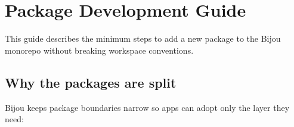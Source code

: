 \chapter{Package Development Guide}\label{record-011}

\smallskip

This guide describes the minimum steps to add a new package to the Bijou monorepo without breaking workspace conventions.

\section{Why the packages are split}\label{record-011-why-the-packages-are-split}

Bijou keeps package boundaries narrow so apps can adopt only the layer they need:


